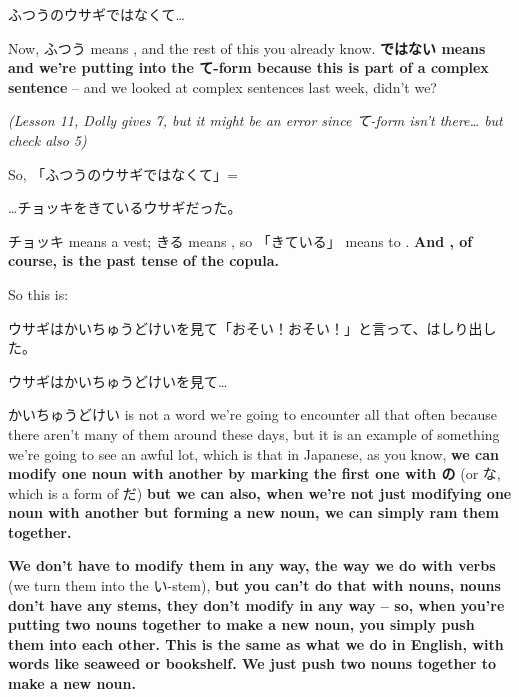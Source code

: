 {}

\startblockquote
ふつうのウサギではなくて\ldots{}
\stopblockquote

Now, ふつう means , and the rest of this you already know. {\bf ではない means  and we're putting into the て-form because this is part of a complex sentence} -- and we looked at complex sentences last week, didn't we?

{\em (Lesson 11, Dolly gives 7, but it might be an error since て-form isn't there\ldots{} but check also 5)}

So, 「ふつうのウサギではなくて」= 

\startblockquote
\ldots{}チョッキをきているウサギだった。
\stopblockquote

チョッキ means a vest; きる means , so 「きている」 means to . {\bf And , of course, is the past tense of the copula.}

{}

So this is: 

\startblockquote
ウサギはかいちゅうどけいを見て「おそい！おそい！」と言って、はしり出した。
\stopblockquote

{}

\startblockquote
ウサギはかいちゅうどけいを見て\ldots{}
\stopblockquote

かいちゅうどけい is not a word we're going to encounter all that often because there aren't many of them around these days, but it is an example of something we're going to see an awful lot, which is that in Japanese, as you know, {\bf we can modify one noun with another by marking the first one with の} (or な, which is a form of だ) {\bf but we can also, when we're not just modifying one noun with another but forming a new noun, we can simply ram them together.}

{\bf We don't have to modify them in any way, the way we do with verbs} (we turn them into the い-stem), {\bf but you can't do that with nouns, nouns don't have any stems, they don't modify in any way -- so, when you're putting two nouns together to make a new noun, you simply push them into each other. This is the same as what we do in English, with words like seaweed or bookshelf. We just push two nouns together to make a new noun.}

